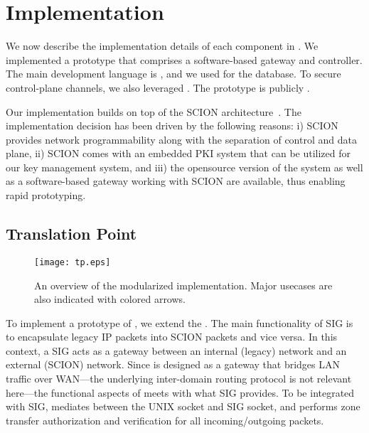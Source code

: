 \chapter{Implementation}
\label{impl}


We now describe the implementation details of each component in \name.
We implemented a prototype that comprises a software-based gateway and controller.
The main development language is , and we used  for the database. To secure control-plane channels, we also leveraged
. The prototype is publicly .

Our implementation builds on top of the SCION architecture~\cite{Perrig2017}.
The implementation decision has been driven by the following reasons: i) SCION provides
network programmability along with the separation of control and data plane, ii) SCION comes
with an embedded PKI system that can be utilized for our key management system, and
iii) the opensource version of the  system as well as a
software-based gateway working with SCION are available, thus enabling rapid prototyping.


\section{Translation Point}
\label{sec:tp}

\begin{figure}[htb]
	\begin{center}
		\texttt{[image: tp.eps]}
	\end{center}
	\caption{An overview of the modularized \tp implementation. Major usecases are also
		indicated with colored arrows.}
	\label{fig:tp}
\end{figure}

To implement a prototype of \tp, we extend the .
The main functionality of SIG is to encapsulate legacy IP packets into SCION packets and
vice versa. In this context, a SIG acts as a gateway between an internal (legacy) network
and an external (SCION) network. Since \tp is designed as a gateway that bridges LAN
traffic over WAN---the underlying inter-domain routing protocol is not relevant here---the
functional aspects of \tp meets with what SIG provides. To be integrated with SIG, \tp
mediates between the UNIX socket and SIG socket, and performs zone transfer authorization
and verification for all incoming/outgoing packets.


